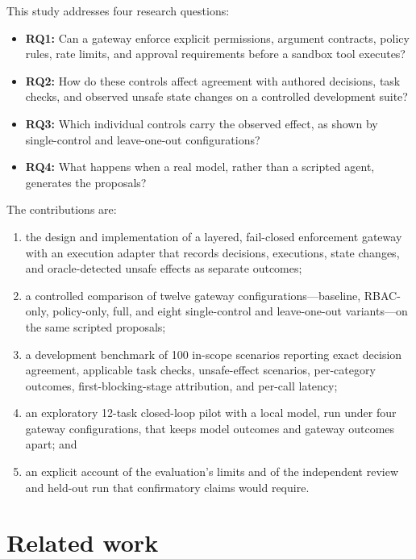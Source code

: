 \documentclass[3p,twocolumn]{elsarticle}
\begin{document}
This study addresses four research questions:
\begin{itemize}
\item \textbf{RQ1:} Can a gateway enforce explicit permissions, argument contracts, policy rules, rate limits, and approval requirements before a sandbox tool executes?
\item \textbf{RQ2:} How do these controls affect agreement with authored decisions, task checks, and observed unsafe state changes on a controlled development suite?
\item \textbf{RQ3:} Which individual controls carry the observed effect, as shown by single-control and leave-one-out configurations?
\item \textbf{RQ4:} What happens when a real model, rather than a scripted agent, generates the proposals?
\end{itemize}
The contributions are:
\begin{enumerate}
\item the design and implementation of a layered, fail-closed enforcement gateway with an execution adapter that records decisions, executions, state changes, and oracle-detected unsafe effects as separate outcomes;
\item a controlled comparison of twelve gateway configurations---baseline, RBAC-only, policy-only, full, and eight single-control and leave-one-out variants---on the same scripted proposals;
\item a development benchmark of 100 in-scope scenarios reporting exact decision agreement, applicable task checks, unsafe-effect scenarios, per-category outcomes, first-blocking-stage attribution, and per-call latency;
\item an exploratory 12-task closed-loop pilot with a local model, run under four gateway configurations, that keeps model outcomes and gateway outcomes apart; and
\item an explicit account of the evaluation's limits and of the independent review and held-out run that confirmatory claims would require.
\end{enumerate}

\section{Related work}\label{sec:related}
\end{document}
